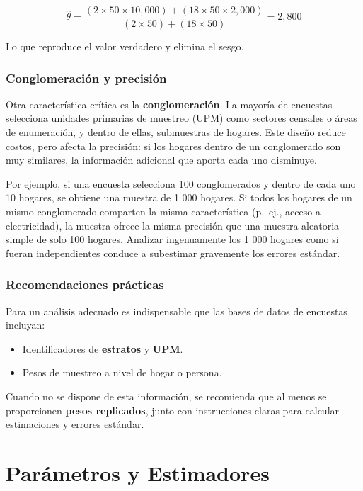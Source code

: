 \documentclass[
  spanish,
  12pt,
]{book}
\providecommand{\tightlist}{%
  \setlength{\itemsep}{0pt}\setlength{\parskip}{0pt}}
\begin{document}
\[
\hat{\theta} = \frac{(2 \times 50 \times 10,000) + (18 \times 50 \times 2,000)}{(2 \times 50) + (18 \times 50)} = 2,800
\]

Lo que reproduce el valor verdadero y elimina el sesgo.

\subsubsection{Conglomeración y precisión}\label{conglomeraciuxf3n-y-precisiuxf3n}

Otra característica crítica es la \textbf{conglomeración}. La mayoría de encuestas selecciona unidades primarias de muestreo (UPM) como sectores censales o áreas de enumeración, y dentro de ellas, submuestras de hogares. Este diseño reduce costos, pero afecta la precisión: si los hogares dentro de un conglomerado son muy similares, la información adicional que aporta cada uno disminuye.

Por ejemplo, si una encuesta selecciona 100 conglomerados y dentro de cada uno 10 hogares, se obtiene una muestra de 1 000 hogares. Si todos los hogares de un mismo conglomerado comparten la misma característica (p.~ej., acceso a electricidad), la muestra ofrece la misma precisión que una muestra aleatoria simple de solo 100 hogares. Analizar ingenuamente los 1 000 hogares como si fueran independientes conduce a subestimar gravemente los errores estándar.

\subsubsection{Recomendaciones prácticas}\label{recomendaciones-pruxe1cticas}

Para un análisis adecuado es indispensable que las bases de datos de encuestas incluyan:

\begin{itemize}
\tightlist
\item
  Identificadores de \textbf{estratos} y \textbf{UPM}.
\item
  Pesos de muestreo a nivel de hogar o persona.
\end{itemize}

Cuando no se dispone de esta información, se recomienda que al menos se proporcionen \textbf{pesos replicados}, junto con instrucciones claras para calcular estimaciones y errores estándar.

\section{Parámetros y Estimadores}\label{paruxe1metros-y-estimadores}
\end{document}
